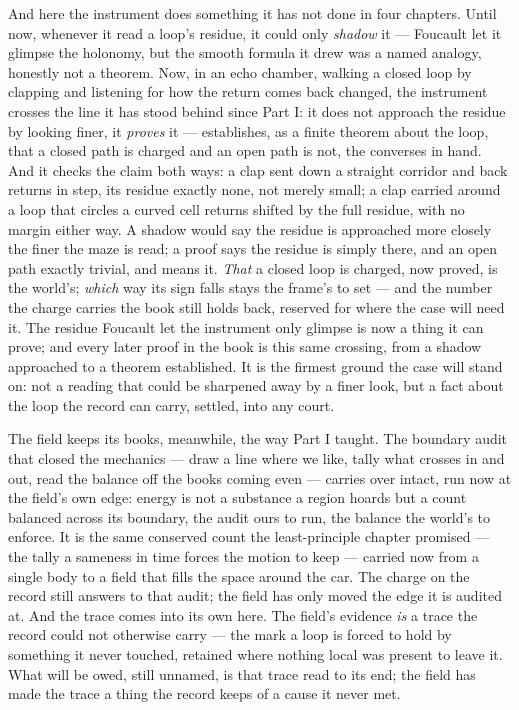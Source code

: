 And here the instrument does something it has not done in four chapters. Until now, whenever it read a loop's
residue, it could only \emph{shadow} it --- Foucault let it glimpse the holonomy, but the smooth formula it
drew was a named analogy, honestly not a theorem. Now, in an echo chamber, walking a closed loop by clapping
and listening for how the return comes back changed, the instrument crosses the line it has stood behind since
Part I: it does not approach the residue by looking finer, it \emph{proves} it --- establishes, as a finite
theorem about the loop, that a closed path is charged and an open path is not, the converses in hand. And it
checks the claim both ways: a clap sent down a straight corridor and back returns in step, its residue exactly
none, not merely small; a clap carried around a loop that circles a curved cell returns shifted by the full
residue, with no margin either way. A shadow would say the residue is approached more closely the finer the
maze is read; a proof says the residue is simply there, and an open path exactly trivial, and means it. \emph{That}
a closed loop is charged, now proved, is the world's; \emph{which} way its sign falls stays the frame's to set
--- and the number the charge carries the book still holds back, reserved for where the case will need it. The
residue Foucault let the instrument only glimpse is now a thing it can prove; and every later proof in the book
is this same crossing, from a shadow approached to a theorem established. It is the firmest
ground the case will stand on: not a reading that could be sharpened away by a finer look, but a fact about the
loop the record can carry, settled, into any court.

The field keeps its books, meanwhile, the way Part I taught. The boundary audit that closed the mechanics ---
draw a line where we like, tally what crosses in and out, read the balance off the books coming even --- carries
over intact, run now at the field's own edge: energy is not a substance a region hoards but a count balanced
across its boundary, the audit ours to run, the balance the world's to enforce. It is the same conserved count
the least-principle chapter promised --- the tally a sameness in time forces the motion to keep --- carried now
from a single body to a field that fills the space around the car. The charge on the record still answers to
that audit; the field has only moved the edge it is audited at. And the trace comes into its own
here. The field's evidence \emph{is} a trace the record could not otherwise carry --- the mark a loop is forced
to hold by something it never touched, retained where nothing local was present to leave it. What will be owed,
still unnamed, is that trace read to its end; the field has made the trace a thing the record keeps of a cause
it never met.

